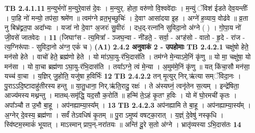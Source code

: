 \documentclass[17pt]{extarticle}
\begin{document}
                  \newline
                                \textbf{ TB 2.4.1.11} \newline
                  म॒न्युर्भगो॑ म॒न्युरे॒वास॑ दे॒वः । म॒न्युर्. होता॒ वरु॑णो वि॒श्ववे॑दाः । म॒न्युं ॅविश॑ ईडते देव॒यन्तीः᳚ । पा॒हि नो॑ मन्यो॒ तप॑सा॒ श्रमे॑ण ॥ त्वम॑ग्ने व्रत॒भृच्छुचिः॑ । दे॒वाꣳ आसा॑दया इ॒ह । अग्ने॑ ह॒व्याय॒ वोढ॑वे ॥ व्र॒ता नु बिभ्र॑द्व्रत॒पा अदा᳚भ्यः । यजा॑ नो दे॒वाꣳ अ॒जरः॑ सु॒वीरः॑ । दध॒द्-रत्ना॑नि सुविदा॒नो अ॑ग्ने ( ) । गो॒पा॒य नो॑ जी॒वसे॑ जातवेदः । \textbf{ 11} \newline
                  \newline
                                    (जिघाꣳ॑स - त्य॒मित्रा᳚ - ञ्जघ॒न्वा - नी॑डते॒ - सर्वा॒ - अꣳह॑सो - वातो - हृ॒दे - रा॑ज - त्य॒ग्निरू॑पाः - सुविदा॒नो अ॑ग्न॒ एकं॑ च ) \textbf{(A1)} \newline \newline
                \textbf{ 2.4.2      अनुवाकं   2 - उपहोमाः} \newline
                                \textbf{ TB 2.4.2.1} \newline
                  चक्षु॑षो हेते॒ मन॑सो हेते । वाचो॑ हेते॒ ब्रह्म॑णो हेते । यो मा॑ऽघा॒यु-र॑भि॒दास॑ति । तम॑ग्ने मे॒न्याऽमे॒निं कृ॑णु ॥ यो मा॒ चक्षु॑षा॒ यो मन॑सा । यो वा॒चा ब्रह्म॑णा ऽघा॒यु-र॑भि॒दास॑ति । तया᳚ऽग्ने॒ त्वं मे॒न्या । अ॒मुम॑मे॒निं कृ॑णु ॥ यत् किंचा॒सौ मन॑सा॒ यच्च॑ वा॒चा । य॒ज्ञिर् जु॒होति॒ यजु॑षा ह॒विर्भिः॑ \textbf{ 12} \newline
                  \newline
                                \textbf{ TB 2.4.2.2} \newline
                  तन् मृ॒त्युर् निर्.ऋ॑त्या सम्ॅविदा॒नः । पु॒राऽऽदि॒ष्टादाहु॑तीरस्य हन्तु ॥ या॒तु॒धाना॒ निर्.ऋ॑ति॒रादु॒ रक्षः॑ । ते अ॑स्यघ्नं॒ त्वनृ॑तेन स॒त्यम् । इन्द्रे॑षिता॒ आज्य॑मस्य मथ्नन्तु । मातथ्-समृ॑द्धि॒ यद॒सौ क॒रोति॑ ॥ हन्मि॑ ते॒ऽहं कृ॒तꣳ ह॒विः । यो मे॑ घो॒रमची॑ कृतः । अपा᳚ञ्चौ त उ॒भौ बा॒हू । अप॑नह्याम्या॒स्य᳚म् । \textbf{ 13} \newline
                  \newline
                                \textbf{ TB 2.4.2.3} \newline
                  अप॑नह्यामि ते बा॒हू । अप॑नह्याम्या॒स्य᳚म् । अ॒ग्नेर् दे॒वस्य॒ ब्रह्म॑णा । सर्वं॑ तेऽवधिषं कृ॒तम् ॥ पु॒रा ऽमुष्य॑ वषट्का॒रात् । य॒ज्ञ्ं दे॒वेषु॑ नस्कृधि । स्वि॑ष्टम॒स्माकं॑ भूयात् । माऽस्मान् प्राप॒न्-नरा॑तयः ॥ अन्ति॑ दू॒रे स॒तो अ॑ग्ने । भ्रातृ॑व्यस्या ऽभि॒दास॑तः \textbf{ 14} \newline
\end{document}
